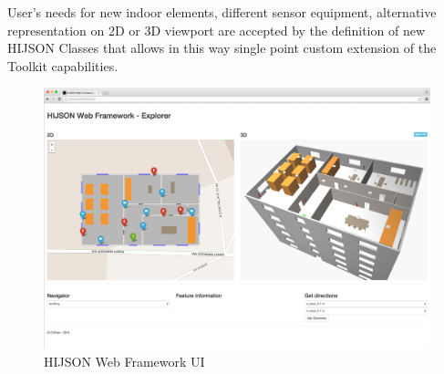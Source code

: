User's needs for new indoor elements, different sensor equipment,
alternative representation on 2D or 3D viewport are accepted by the
definition of new HIJSON Classes that allows in this way single point
custom extension of the Toolkit capabilities.


\begin{figure}[htb]
\centering
\includegraphics[width=\textwidth]{images/web_framework_2.png}
\caption{HIJSON Web Framework UI}
\label{fig:web-framework-ui}
\end{figure}
